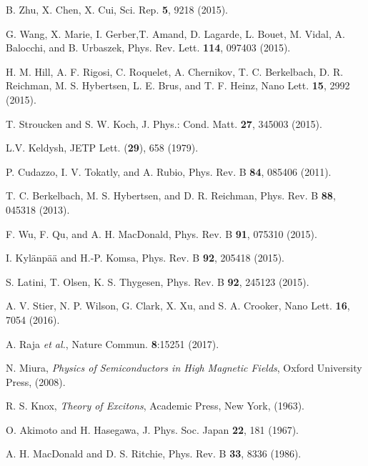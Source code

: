 \documentclass[aps,prl,twocolumn]{revtex4-1}
\begin{document}
\begin{references}
B. Zhu, X. Chen, X. Cui, Sci. Rep. \textbf{5}, 9218 (2015). %

G. Wang, X. Marie, I. Gerber,T. Amand, D. Lagarde, L. Bouet, M. Vidal, A. Balocchi, and B. Urbaszek, Phys. Rev. Lett. \textbf{114}, 097403 (2015). %

H. M. Hill, A. F. Rigosi, C. Roquelet, A. Chernikov, T. C. Berkelbach, D. R. Reichman, M. S. Hybertsen, L. E. Brus, and T. F. Heinz, Nano Lett. \textbf{15}, 2992 (2015). %

T. Stroucken and S. W. Koch, J. Phys.: Cond. Matt. \textbf{27}, 345003 (2015). %

L.V. Keldysh, JETP Lett. (\textbf{29}), 658 (1979).

P. Cudazzo, I. V. Tokatly, and A. Rubio, Phys. Rev. B \textbf{84}, 085406 (2011).

 T. C. Berkelbach, M. S. Hybertsen, and D. R. Reichman, Phys. Rev. B \textbf{88}, 045318 (2013).

F. Wu, F. Qu, and A. H. MacDonald, Phys. Rev. B \textbf{91}, 075310 (2015).

I. Kyl\"{a}np\"{a}\"{a} and H.-P. Komsa, Phys. Rev. B \textbf{92}, 205418 (2015).

S. Latini, T. Olsen, K. S. Thygesen, Phys. Rev. B \textbf{92}, 245123 (2015).

 A. V. Stier, N. P. Wilson, G. Clark, X. Xu, and S. A. Crooker, Nano Lett. \textbf{16}, 7054 (2016).

 A. Raja \textit{et al.}, Nature Commun. \textbf{8}:15251 (2017).

N. Miura, \emph{Physics of Semiconductors in High Magnetic Fields}, Oxford University Press, (2008).

R. S. Knox, \emph{Theory of Excitons}, Academic Press, New York, (1963).

O. Akimoto and H. Hasegawa, J. Phys. Soc. Japan \textbf{22}, 181 (1967).

A. H. MacDonald and D. S. Ritchie, Phys. Rev. B \textbf{33}, 8336 (1986).


\end{references}
\end{document}
